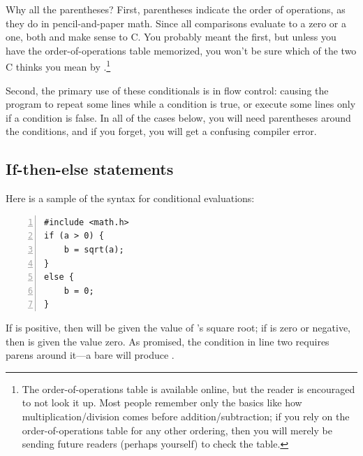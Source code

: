Why all the parentheses? First, parentheses indicate the order of
operations, as they do in pencil-and-paper math. Since all comparisons
evaluate to a zero or a one, both 
and  make sense to C. You probably meant
the first, but unless you have the order-of-operations table memorized,
you won't be sure which of the two C thinks you mean by .\footnote{The order-of-operations table is available
online, but the reader is encouraged to not look it up. Most
people remember only the basics like how multiplication/division comes before
addition/subtraction; if you rely on the order-of-operations table
for any other ordering, then you will merely be sending future readers
(perhaps yourself) to check the table.}

Second, the primary use of these conditionals is in flow control: causing
the program to repeat some lines while a condition is true, or execute some lines only if a condition is
false.  In all of the cases below, you will need parentheses around the conditions, and if you forget,
you will get a confusing compiler error.

\subsection{If-then-else statements} Here is a sample of the syntax for conditional evaluations: 

\begin{lstlisting}[numbers=left, numberstyle=\scshape]
#include <math.h>
if (a > 0) { 
    b = sqrt(a); 
}
else { 
    b = 0; 
}
\end{lstlisting}
If  is positive, then  will be given the value of 's
square root; if  is zero or negative, then  is given the
value zero. As promised, the condition in line two requires parens around
it---a bare  will produce .

